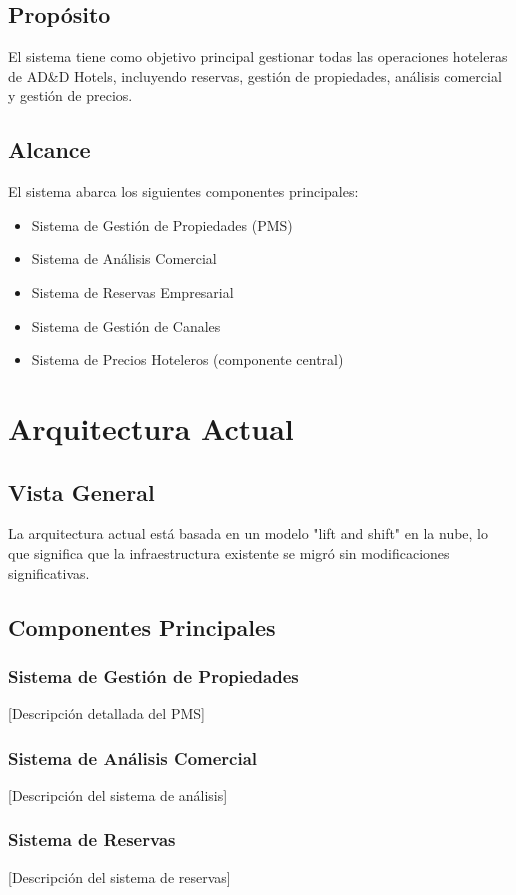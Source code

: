 \subsection{Propósito}
El sistema tiene como objetivo principal gestionar todas las operaciones hoteleras de AD\&D Hotels, incluyendo reservas, gestión de propiedades, análisis comercial y gestión de precios.

\subsection{Alcance}
El sistema abarca los siguientes componentes principales:
\begin{itemize}
    \item Sistema de Gestión de Propiedades (PMS)
    \item Sistema de Análisis Comercial
    \item Sistema de Reservas Empresarial
    \item Sistema de Gestión de Canales
    \item Sistema de Precios Hoteleros (componente central)
\end{itemize}

\section{Arquitectura Actual}
\subsection{Vista General}
La arquitectura actual está basada en un modelo "lift and shift" en la nube, lo que significa que la infraestructura existente se migró sin modificaciones significativas.

\subsection{Componentes Principales}
\subsubsection{Sistema de Gestión de Propiedades}
[Descripción detallada del PMS]

\subsubsection{Sistema de Análisis Comercial}
[Descripción del sistema de análisis]

\subsubsection{Sistema de Reservas}
[Descripción del sistema de reservas]

